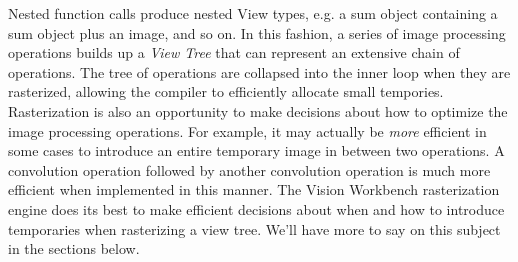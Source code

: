 Nested function calls produce nested View types, e.g. a sum object
containing a sum object plus an image, and so on.  In this fashion, a
series of image processing operations builds up a {\em View Tree} that
can represent an extensive chain of operations.  The tree of
operations are collapsed into the inner loop when they are rasterized,
allowing the compiler to efficiently allocate small tempories.
Rasterization is also an opportunity to make decisions about how to
optimize the image processing operations.  For example, it may
actually be {\em more} efficient in some cases to introduce an entire
temporary image in between two operations.  A convolution operation
followed by another convolution operation is much more efficient when
implemented in this manner.  The Vision Workbench rasterization engine
does its best to make efficient decisions about when and how to
introduce temporaries when rasterizing a view tree.  We'll have more
to say on this subject in the sections below.







